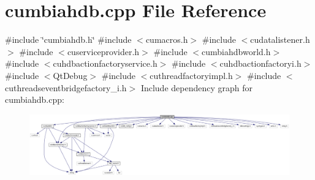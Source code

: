 \section{cumbiahdb.\+cpp File Reference}
\label{cumbiahdb_8cpp}
{\ttfamily \#include \char`\"{}cumbiahdb.\+h\char`\"{}}\newline
{\ttfamily \#include $<$cumacros.\+h$>$}\newline
{\ttfamily \#include $<$cudatalistener.\+h$>$}\newline
{\ttfamily \#include $<$cuserviceprovider.\+h$>$}\newline
{\ttfamily \#include $<$cumbiahdbworld.\+h$>$}\newline
{\ttfamily \#include $<$cuhdbactionfactoryservice.\+h$>$}\newline
{\ttfamily \#include $<$cuhdbactionfactoryi.\+h$>$}\newline
{\ttfamily \#include $<$Qt\+Debug$>$}\newline
{\ttfamily \#include $<$cuthreadfactoryimpl.\+h$>$}\newline
{\ttfamily \#include $<$cuthreadseventbridgefactory\+\_\+i.\+h$>$}\newline
Include dependency graph for cumbiahdb.\+cpp\+:
\nopagebreak
\begin{figure}[H]
\begin{center}
\leavevmode
\includegraphics[width=350pt]{cumbiahdb_8cpp__incl}
\end{center}
\end{figure}
